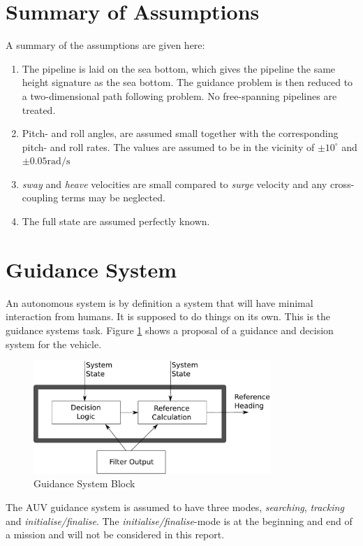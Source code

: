 \section{Summary of Assumptions}
	A summary of the assumptions are given here:
	\begin{enumerate}
		\item The pipeline is laid on the sea bottom, which gives the pipeline the same
		height signature as the sea bottom. The guidance problem is then reduced to a
		two-dimensional path following problem. No free-spanning pipelines are treated.
		\item Pitch- and roll angles, are assumed small together with the corresponding pitch- and
		roll rates. The values are assumed to be in the vicinity of $\pm 10^{\circ}$ and $\pm 0.05
		\mathrm{rad/s}$
		\item \textit{sway} and \textit{heave} velocities are small compared to \textit{surge}
		velocity and any cross-coupling terms may be neglected.
		\item The full state are assumed perfectly known.
	\end{enumerate}
		


\section{Guidance System}
	An autonomous system is by definition a system that will have minimal interaction from humans. It is
	supposed to do things on its own. This is the guidance systems task.
	Figure \ref{fig:ch2-Guidance-block} shows a proposal of a guidance and decision system for 
	the \hugin vehicle.
	\begin{figure}[htbp]
		\centering
		\includegraphics[width=0.8\textwidth]{pics/guidance}
		\caption{Guidance System Block}
		\label{fig:ch2-Guidance-block}
	\end{figure}

	The AUV guidance system is assumed to have three modes, \textit{searching}, \textit{tracking} and
	\textit{initialise/finalise}. The \textit{initialise/finalise}-mode is at the beginning and end of a
	mission and will not be considered in this report. 
	
